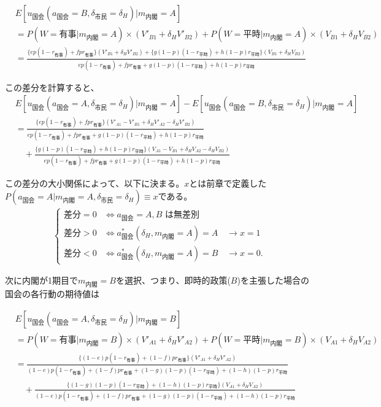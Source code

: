 \documentclass[main.tex]{subfiles}
\begin{document}
\begin{align*}
    & E[u_{国会}(a_{国会}=B, \delta_{市民}=\delta_H) | m_{内閣} = A  ]\\[0.5em]
    &= P(W=有事 | m_{内閣}=A) × (V'_{B1} + \delta_H V'_{B2}) + P(W=平時 | m_{内閣}=A) × (V_{B1} + \delta_H V_{B2})\\[0.5em]
    &= \frac{ \{ep(1-r_{有事}) +  fpr_{有事}\}(V'_{B1} + \delta_H V'_{B2}) +  \{g(1-p)(1-r_{平時}) + h(1-p)r_{平時}\}(V_{B1} + \delta_H V_{B2})  }{ ep(1-r_{有事}) + fpr_{有事} + g(1-p)(1-r_{平時}) + h(1-p)r_{平時} }
\end{align*}

\bigskip
この差分を計算すると、
\begin{align*}
    & E[u_{国会}(a_{国会}=A, \delta_{市民}=\delta_H) | m_{内閣} = A  ] - E[u_{国会}(a_{国会}=B, \delta_{市民}=\delta_H) | m_{内閣} = A  ]\\[1em]
    &= \frac{ \{ep(1-r_{有事}) +  fpr_{有事}\}(V'_{A1} -V'_{B1} + \delta_H V'_{A2} - \delta_H V'_{B2})  }{ ep(1-r_{有事}) + fpr_{有事} + g(1-p)(1-r_{平時}) + h(1-p)r_{平時} }\\[1em]
    &\quad + \frac{ \{g(1-p)(1-r_{平時}) + h(1-p)r_{平時}\}(V_{A1} - V_{B1} + \delta_H V_{A2} - \delta_H V_{B2} ) }{ ep(1-r_{有事}) + fpr_{有事} + g(1-p)(1-r_{平時}) + h(1-p)r_{平時} }
\end{align*}

\bigskip
この差分の大小関係によって、以下に決まる。$x$とは前章で定義した\\
$P(a_{国会} = A| m_{内閣} = A, \delta_{市民} = \delta_H ) \equiv x$である。
\begin{align*}
    \begin{cases}
         \text{差分} = 0 &\Leftrightarrow \text{$a_{\text{国会}} = A, B$ は無差別} \\
         \text{差分} > 0 &\Leftrightarrow a^*_{\text{国会}}(\delta_H, m_{\text{内閣}} = A) = A \quad\rightarrow x = 1 \\
         \text{差分} < 0 &\Leftrightarrow a^*_{\text{国会}}(\delta_H, m_{\text{内閣}} = A) = B \quad\rightarrow x = 0.
    \end{cases}
\end{align*}





\bigskip
次に内閣が1期目で$m_{内閣}=B$を選択、つまり、即時的政策($B$)を主張した場合の国会の各行動の期待値は

\begin{align*}
    & E[u_{国会}(a_{国会}=A, \delta_{市民}=\delta_H) | m_{内閣} = B  ]\\[0.5em]
    &= P(W=有事 | m_{内閣}=B) × (V'_{A1} + \delta_H V'_{A2}) + P(W=平時 | m_{内閣}=B) × (V_{A1} + \delta_H V_{A2})\\[0.5em]
    &= \frac{ \{(1-e)p(1-r_{有事}) +  (1-f)pr_{有事}\}(V'_{A1} + \delta_H V'_{A2}) }{ (1-e)p(1-r_{有事}) + (1-f)pr_{有事} + (1-g)(1-p)(1-r_{平時}) + (1-h)(1-p)r_{平時} }\\[1em]
    &\quad + \frac{ \{(1-g)(1-p)(1-r_{平時}) + (1-h)(1-p)r_{平時}\}(V_{A1} + \delta_H V_{A2}) }{ (1-e)p(1-r_{有事}) + (1-f)pr_{有事} + (1-g)(1-p)(1-r_{平時}) + (1-h)(1-p)r_{平時} }
\end{align*}
\end{document}
